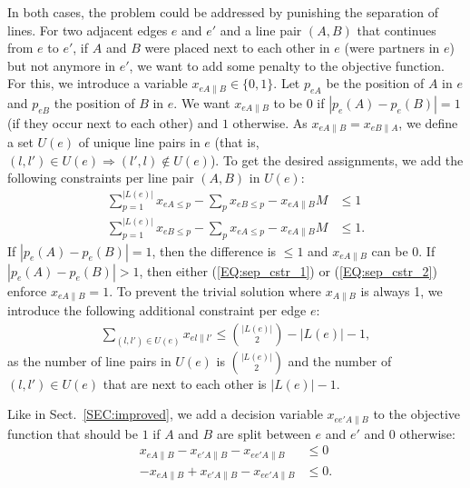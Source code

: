 \documentclass{llncs}
\begin{document}
In both cases, the problem could be addressed by punishing the separation of lines. For two adjacent edges $e$ and $e'$ and a line pair $(A, B)$ that continues from $e$ to $e'$, if $A$ and $B$ were placed next to each other in $e$ (were partners in $e$) but not anymore in $e'$, we want to add some penalty to the objective function. For this, we introduce a variable $x_{eA\|B} \in \{0, 1\}$. Let $p_{eA}$ be the position of $A$ in $e$ and $p_{eB}$ the position of $B$ in $e$. We want $x_{eA\|B}$ to be $0$ if $\left|p_{e}(A) - p_{e}(B)\right| = 1$ (if they occur next to each other) and $1$ otherwise. As $x_{eA\|B} = x_{eB\|A}$, we define a set $U(e)$ of unique line pairs in $e$ (that is, $(l, l') \in U(e) \Rightarrow (l', l) \not\in U(e)$). To get the desired assignments, we add the following constraints per line pair $(A, B)$ in $U(e)$:
\begin{align}
	\sum_{p=1}^{\left|L\left(e\right)\right|} x_{eA\leq p} - \sum_{p} x_{eB\leq p} - x_{eA\|B} M &\leq 1 \label{EQ:sep_cstr_1} \\
	\sum_{p=1}^{\left|L\left(e\right)\right|} x_{eB\leq p} - \sum_{p} x_{eA\leq p} - x_{eA\|B} M &\leq 1. \label{EQ:sep_cstr_2}
\end{align}
If $|p_{e}(A) - p_{e}(B)| = 1$, then the difference is $\leq 1$ and $x_{eA\|B}$ can be 0. If $|p_{e}(A) - p_{e}(B)| > 1$, then either (\ref{EQ:sep_cstr_1}) or (\ref{EQ:sep_cstr_2}) enforce $x_{eA\|B} = 1$. To prevent the trivial solution where $x_{A\|B}$ is always 1, we introduce the following additional constraint per edge $e$:
\begin{align*}
	\sum_{(l, l') \in U(e)} x_{el\|l'} \leq \binom{\left|L\left(e\right)\right|}{2} - \left|L\left(e\right)\right| - 1,
\end{align*}
as the number of line pairs in $U(e)$ is $\binom{\left|L\left(e\right)\right|}{2}$ and the number of $(l, l') \in U(e)$ that are next to each other is $\left|L\left(e\right)\right| - 1$.

Like in Sect.~\ref{SEC:improved}, we add a decision variable $x_{ee'A\|B}$ to the objective function that should be $1$ if $A$ and $B$ are split between $e$ and $e'$ and $0$ otherwise:
\begin{align*}
	x_{eA\|B} - x_{e'A\|B} - x_{ee'A\|B} &\leq 0 \\
	-x_{eA\|B} + x_{e'A\|B} - x_{ee'A\|B} &\leq 0.
\end{align*}
\end{document}
